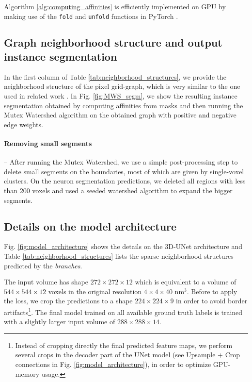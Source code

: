 Algorithm \ref{alg:computing_affinities} is efficiently implemented on GPU by making use of the \texttt{fold} and \texttt{unfold} functions in PyTorch \cite{NEURIPS2019_9015}. 


\subsection{Graph neighborhood structure and output instance segmentation}
In the first column of Table \ref{tab:neighborhood_structures}, we provide the neighborhood structure of the pixel grid-graph, which is very similar to the one used in related work \cite{wolf2018mutex,lee2017superhuman}.
In Fig. \ref{fig:MWS_segm}, we show the resulting instance segmentation obtained by computing affinities from \maskname masks and then running the Mutex Watershed algorithm on the obtained graph with positive and negative edge weights.

\paragraph{Removing small segments} -- After running the Mutex Watershed, we use a simple post-processing step to delete small segments on the boundaries, most of which are given by single-voxel clusters. On the neuron segmentation predictions, we deleted all regions with less than 200 voxels and used a seeded watershed algorithm to expand the bigger segments.


\subsection{Details on the model architecture}
Fig. \ref{fig:model_architecture} shows the details on the 3D-UNet architecture and Table \ref{tab:neighborhood_structures} lists the sparse neighborhood structures predicted by the \emph{\sparseBr branches}.

The input volume has shape $272 \times 272\times12$ which is equivalent to a volume of $544\times 544\times 12$ voxels in the original resolution $4\times 4\times 40$ nm$^3$. Before to apply the loss, we crop the predictions to a shape $224\times 224\times 9$ in order to avoid border artifacts\footnote{Instead of cropping directly the final predicted feature maps, we perform several crops in the decoder part of the UNet model (see Upsample + Crop connections in Fig. \ref{fig:model_architecture}), in order to optimize GPU-memory usage.}.
The final model trained on all available ground truth labels is trained with a slightly larger input volume of $288\times 288\times 14$.



